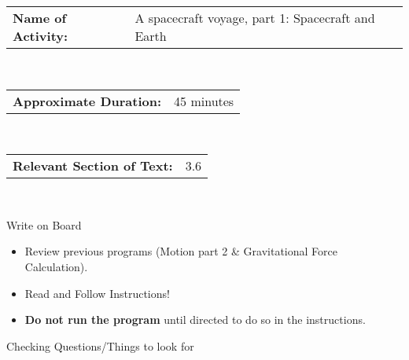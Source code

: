 \documentclass[11pt]{article}
\begin{document}
\begin{noindent}
\begin{flushleft}

\newcommand{\detail}[2]
{\begin{tabularx}{6.5in}{p{2in} X}
\textbf{#1:} & #2
\end{tabularx}
\vspace{11pt}}

\detail{Name of Activity}{A spacecraft voyage, part 1: Spacecraft and Earth }\\
\detail{Approximate Duration}{45 minutes}\\
\detail{Relevant Section of Text}{3.6}\\

\begin{description}
\item[ Write on Board] 
\end{description}

\begin{itemize}
\item Review previous programs (Motion part 2 \& Gravitational Force Calculation).
\item Read and Follow Instructions!
\item \textbf{Do not run the program} until directed to do so in the instructions.
\end{itemize}

\begin{description}
\item[Checking Questions/Things to look for] 
\end{description}


\end{flushleft}
\end{noindent}
\end{document}
